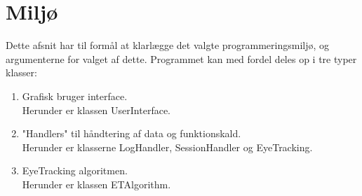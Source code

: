\documentclass[softwarearkitektur.tex]{subfiles}
\begin{document}
\section{Miljø}
Dette afsnit har til formål at klarlægge det valgte programmeringsmiljø, og argumenterne for valget af dette. 
Programmet kan med fordel deles op i tre typer klasser:
\begin{enumerate}
	\item Grafisk bruger interface. \\
	Herunder er klassen UserInterface.
	\item "Handlers" til håndtering af data og funktionskald. \\
	Herunder er klasserne LogHandler, SessionHandler og EyeTracking.
	\item EyeTracking algoritmen. \\
	Herunder er klassen ETAlgorithm.
\end{enumerate}
\end{document}
